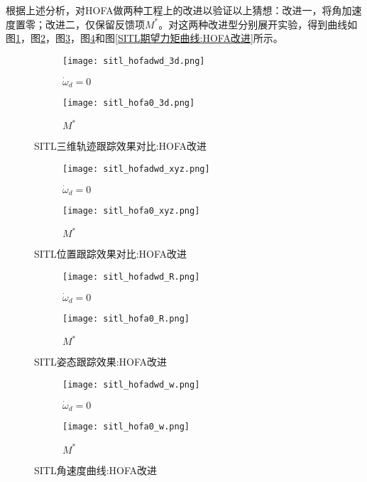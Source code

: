 根据上述分析，对HOFA做两种工程上的改进以验证以上猜想：改进一，将角加速度置零；改进二，仅保留反馈项$M^*$。对这两种改进型分别展开实验，得到曲线如图\ref{SITL三维轨迹跟踪效果对比:HOFA改进}，图\ref{SITL位置跟踪效果对比:HOFA改进}，图\ref{SITL姿态跟踪效果:HOFA改进}，图\ref{SITL角速度曲线:HOFA改进}和图\ref{SITL期望力矩曲线:HOFA改进}所示。
\begin{figure}[H]
  \centering
  \begin{subfigure}[b]{0.49\linewidth}
      \texttt{[image: sitl\_hofadwd\_3d.png]}
      \caption{$\dot \omega_d =0$}
  \end{subfigure}
  \hfill %
  \begin{subfigure}[b]{0.49\linewidth}
      \texttt{[image: sitl\_hofa0\_3d.png]}
      \caption{$M^*$}
  \end{subfigure}
  \caption{SITL三维轨迹跟踪效果对比:HOFA改进}
  \label{SITL三维轨迹跟踪效果对比:HOFA改进}
\end{figure}
  \begin{figure}[H]
    \centering
  \begin{subfigure}[b]{0.49\linewidth}
      \texttt{[image: sitl\_hofadwd\_xyz.png]}
      \caption{$\dot \omega_d =0$}
  \end{subfigure}
  \hfill
  \begin{subfigure}[b]{0.49\linewidth}
      \texttt{[image: sitl\_hofa0\_xyz.png]}
      \caption{$M^*$}
  \end{subfigure}
  \caption{SITL位置跟踪效果对比:HOFA改进}
  \label{SITL位置跟踪效果对比:HOFA改进}
\end{figure}
\begin{figure}[H]
  \centering
\begin{subfigure}[b]{0.49\linewidth}
    \texttt{[image: sitl\_hofadwd\_R.png]}
    \caption{$\dot \omega_d =0$}
\end{subfigure}
\hfill
\begin{subfigure}[b]{0.49\linewidth}
    \texttt{[image: sitl\_hofa0\_R.png]}
    \caption{$M^*$}
\end{subfigure}
\caption{SITL姿态跟踪效果:HOFA改进}
\label{SITL姿态跟踪效果:HOFA改进}
\end{figure}
\begin{figure}[H]
  \centering
\begin{subfigure}[b]{0.49\linewidth}
    \texttt{[image: sitl\_hofadwd\_w.png]}
    \caption{$\dot \omega_d =0$}
\end{subfigure}
\hfill
\begin{subfigure}[b]{0.49\linewidth}
    \texttt{[image: sitl\_hofa0\_w.png]}
    \caption{$M^*$}
\end{subfigure}
\caption{SITL角速度曲线:HOFA改进}
\label{SITL角速度曲线:HOFA改进}
\end{figure}
